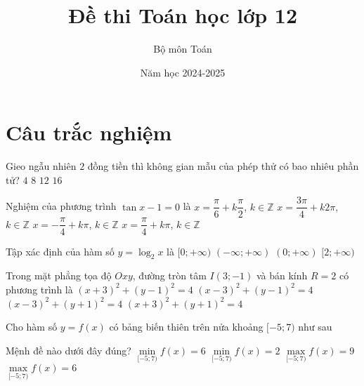 \documentclass{article}
\begin{document}
\title{Đề thi Toán học lớp 12}
\author{Bộ môn Toán}
\date{Năm học 2024-2025}

\maketitle

\section{Câu trắc nghiệm}

\begin{ex}
	Gieo ngẫu nhiên $2$ đồng tiền thì không gian mẫu của phép thử có bao nhiêu phần tử?
	\choice
	{\True $4$}
	{$8$}
	{$12$}
	{$16$}
\end{ex}

\begin{ex}
	Nghiệm của phương trình $\tan x-1=0$ là
	\choice
	{$x=\dfrac{\pi}{6}+k \dfrac{\pi}{2}$, $k\in \mathbb{Z}$}
	{$x=\dfrac{3 \pi}{4}+k 2 \pi$, $k\in \mathbb{Z}$}
	{$x=-\dfrac{\pi}{4}+k \pi$, $k\in \mathbb{Z}$}
	{\True $x=\dfrac{\pi}{4}+k \pi$, $k\in \mathbb{Z}$}
\end{ex}

\begin{ex}
	Tập xác định của hàm số $y=\log _2 x$ là
	\choice
	{$[0 ;+\infty)$}
	{$(-\infty ;+\infty)$}
	{\True $(0 ;+\infty)$}
	{$[2 ;+\infty)$}
\end{ex}

\begin{ex}
	Trong mặt phẳng tọa độ $Oxy$, đường tròn tâm $I(3;-1)$ và bán kính $R=2$ có phương trình là
	\choice
	{$(x+3)^2+(y-1)^2=4$}
	{$(x-3)^2+(y-1)^2=4$}
	{\True $(x-3)^2+(y+1)^2=4$}
	{$(x+3)^2+(y+1)^2=4$}
\end{ex}

\begin{ex}
	Cho hàm số $y=f(x)$ có bảng biến thiên trên nửa khoảng $[-5;7)$ như sau
	\begin{center}
	\end{center}
	Mệnh đề nào dưới đây đúng?
	\choice
	{$\mathop {\min }\limits_{[ - 5;7)}  f(x)=6$}
	{\True $\mathop {\min }\limits_{[ - 5;7)} f(x)=2$}
	{$\mathop {\max }\limits_{[ - 5;7)} f(x)=9$}
	{$\mathop {\max }\limits_{[ - 5;7)} f(x)=6$}
	\loigiai{
	Từ bảng biến thiên ta có $\mathop {\min }\limits_{[ - 5;7)} f(x)=2$.}
\end{ex}
\end{document}
